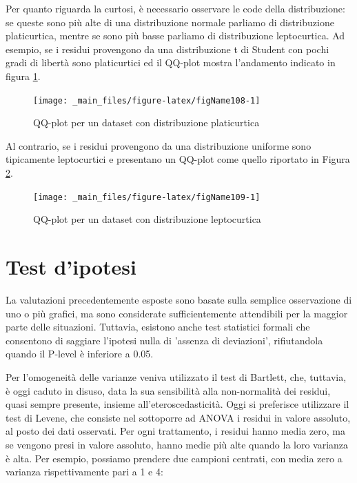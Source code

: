 \documentclass[a4paper,12pt,oneside]{book}
\begin{document}
Per quanto riguarda la curtosi, è necessario osservare le code della distribuzione: se queste sono più alte di una distribuzione normale parliamo di distribuzione platicurtica, mentre se sono più basse parliamo di distribuzione leptocurtica. Ad esempio, se i residui provengono da una distribuzione t di Student con pochi gradi di libertà sono platicurtici ed il QQ-plot mostra l'andamento indicato in figura \ref{fig:figName108}.

\begin{figure}

{\centering \texttt{[image: \_main\_files/figure-latex/figName108-1]} 

}

\caption{QQ-plot per un dataset con distribuzione platicurtica}\label{fig:figName108}
\end{figure}

Al contrario, se i residui provengono da una distribuzione uniforme sono tipicamente leptocurtici e presentano un QQ-plot come quello riportato in Figura \ref{fig:figName109}.

\begin{figure}

{\centering \texttt{[image: \_main\_files/figure-latex/figName109-1]} 

}

\caption{QQ-plot per un dataset con distribuzione leptocurtica}\label{fig:figName109}
\end{figure}

\hypertarget{test-dipotesi-1}{%
\section{Test d'ipotesi}\label{test-dipotesi-1}}

La valutazioni precedentemente esposte sono basate sulla semplice osservazione di uno o più grafici, ma sono considerate sufficientemente attendibili per la maggior parte delle situazioni. Tuttavia, esistono anche test statistici formali che consentono di saggiare l'ipotesi nulla di 'assenza di deviazioni', rifiutandola quando il P-level è inferiore a 0.05.

Per l'omogeneità delle varianze veniva utilizzato il test di Bartlett, che, tuttavia, è oggi caduto in disuso, data la sua sensibilità alla non-normalità dei residui, quasi sempre presente, insieme all'eteroscedasticità. Oggi si preferisce utilizzare il test di Levene, che consiste nel sottoporre ad ANOVA i residui in valore assoluto, al posto dei dati osservati. Per ogni trattamento, i residui hanno media zero, ma se vengono presi in valore assoluto, hanno medie più alte quando la loro varianza è alta. Per esempio, possiamo prendere due campioni centrati, con media zero a varianza rispettivamente pari a 1 e 4:
\end{document}
